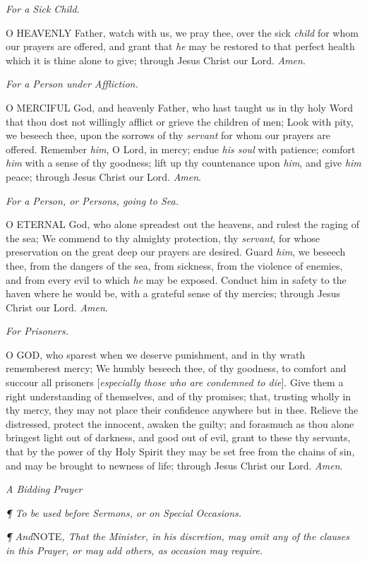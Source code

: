 \emph{For a Sick Child.}

O
HEAVENLY Father, watch with us, we pray thee, over the sick \emph{child}
for whom our prayers are offered, and grant that \emph{he} may be restored
to that perfect health which it is thine alone to give; through Jesus
Christ our Lord. \emph{Amen}.

\emph{For
a Person under Affliction.}

O
MERCIFUL God, and heavenly Father, who hast taught us in thy holy Word
that thou dost not willingly afflict or grieve the children of men; Look
with pity, we beseech thee, upon the sorrows of thy \emph{servant} for
whom our prayers are offered. Remember \emph{him}, O Lord, in mercy;
endue \emph{his soul} with patience; comfort \emph{him} with a sense
of thy goodness; lift up thy countenance upon \emph{him}, and give \emph{him}
peace; through Jesus Christ our Lord. \emph{Amen}.

\emph{For
a Person, or Persons, going to Sea.}

O
ETERNAL God, who alone spreadest out the heavens, and rulest the raging
of the sea; We commend to thy almighty protection, thy \emph{servant},
for whose preservation on the great deep our prayers are desired. Guard
\emph{him}, we beseech thee, from the dangers of the sea, from sickness,
from the violence of enemies, and from every evil to which \emph{he}
may be exposed. Conduct him in safety to the haven where he would be,
with a grateful sense of thy mercies; through Jesus Christ our Lord. \emph{Amen}.

\emph{For
Prisoners.}

O
GOD, who sparest when we deserve punishment, and in thy wrath rememberest
mercy; We humbly beseech thee, of thy goodness, to comfort and succour
all prisoners [\emph{especially those who are condemned to die}]. Give
them a right understanding of themselves, and of thy promises; that, trusting
wholly in thy mercy, they may not place their confidence anywhere but
in thee. Relieve the distressed, protect the innocent, awaken the guilty;
and forasmuch as thou alone bringest light out of darkness, and good out
of evil, grant to these thy servants, that by the power of thy Holy Spirit
they may be set free from the chains of sin, and may be brought to newness
of life; through Jesus Christ our Lord. \emph{Amen}.

\emph{A
Bidding Prayer}

\emph{¶ To be used before Sermons, or on Special
Occasions.}

\emph{¶
And}NOTE\emph{,
That the Minister, in his discretion, may omit any of the clauses in this
Prayer, or may add others, as occasion may require.}

